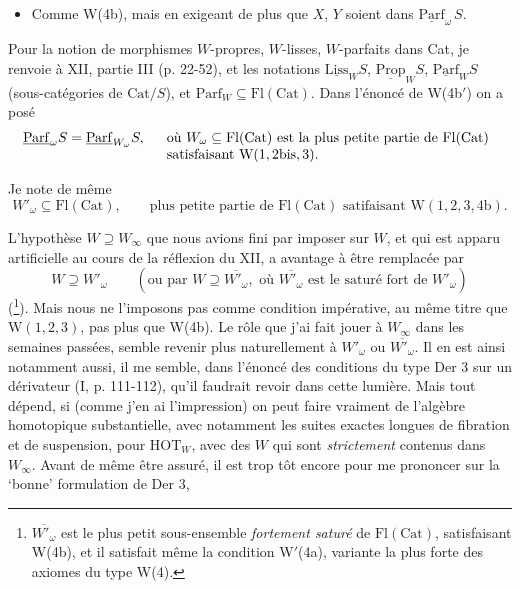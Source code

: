 \documentclass[11pt]{article}
\newcommand{\printedpage}[1]{\marginpar{\footnotesize p.~#1}}
\newcommand{\msp}[1]{\marginpar{\footnotesize [#1]}}
\newcommand{\ul}[1]{\underline{\mathrm{#1}}}
\begin{document}
\begin{itemize}[leftmargin=4em]
\item[W(4b$'$)] Comme W(4b), mais en exigeant de plus que $X$, $Y$ soient dans $\ul{Parf}_\omega\, S$.
\end{itemize}

\msp{page 172}

Pour la notion de morphismes $W$-propres, $W$-lisses, $W$-parfaits dans Cat, je renvoie à XII, partie III (p. 22-52), et les notations $\ul{Liss}_W S$, $\ul{Prop}_W S$, $\ul{Parf}_W S$ (sous-catégories de $\mathrm{Cat}/S$), et $\mathrm{Parf}_W \subseteq \mathrm{Fl}(\mathrm{Cat})$. Dans l'énoncé de W(4b$'$) on a posé
\[
\ul{Parf}_\omega S = \ul{Parf}_{W_\omega} S, \quad
\begin{array}[t]{l}
\text{où } W_\omega \subseteq \mathrm{Fl}(\mathrm{Cat}) \text{ est la plus petite partie de } \mathrm{Fl}(\mathrm{Cat})\\
\text{satisfaisant } \mathrm{W}(1, 2\mathrm{bis}, 3).
\end{array}
\]

Je note de même
\[
W'_\omega \subseteq \mathrm{Fl}(\mathrm{Cat}), \qquad \text{plus petite partie de } \mathrm{Fl}(\mathrm{Cat}) \text{ satifaisant } \mathrm{W}(1, 2, 3, 4\mathrm{b}). %
\]

\printedpage{105}

L'hypothèse $W \supseteq W_\infty$ que nous avions fini par imposer sur $W$, et qui est apparu artificielle au cours de la réflexion du XII, a avantage à être remplacée par %
\[
W \supseteq W'_\omega \qquad (\text{ou par } W \supseteq \overline{W'_\omega}, \text{ où } \overline{W'_\omega} \text{ est le saturé fort de } W'_\omega)
\]
(\footnote{$\overline{W'_\omega}$ est le plus petit sous-ensemble \textit{fortement saturé} de $\mathrm{Fl}(\mathrm{Cat})$, satisfaisant W(4b), et il satisfait même la condition W$'$(4a), variante la plus forte des axiomes du type W(4).}). Mais nous ne l'imposons pas comme condition impérative, au même titre que $\mathrm{W}(1,2,3)$, pas plus que W(4b). Le rôle que j'ai fait jouer à $W_\infty$ dans les semaines passées, semble revenir plus naturellement à $W'_\omega$ ou $\overline{W'_\omega}$. Il en est ainsi notamment aussi, il me semble, dans l'énoncé des conditions du type Der 3 sur un dérivateur (I, p. 111-112), qu'il faudrait revoir dans cette lumière. Mais tout dépend, si (comme j'en ai l'impression) on peut faire vraiment de l'algèbre homotopique substantielle, avec notamment les suites exactes longues de fibration et de suspension, pour $\mathrm{HOT}_W$, avec des $W$ qui sont \textit{strictement} contenus dans $W_\infty$. Avant de même être assuré, il est trop tôt encore pour me prononcer sur la `bonne' formulation de Der 3,
\end{document}
